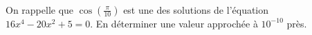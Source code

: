 \exer{[SATIO-001]}
\setcounter{numques}{0}~\\

\question{}  On rappelle que $\cos\left(\frac{\pi}{10}\right)$ est une des solutions de l'équation $16x^4-20x^2+5 = 0$. En déterminer une valeur approchée à $10^{-10}$ près.
